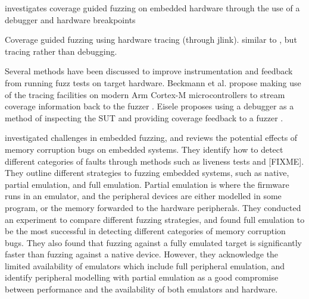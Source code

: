 \documentclass[../report.tex]{subfiles}
\begin{document}
\citet{Eisele_2022} investigates coverage guided fuzzing on embedded hardware through the use of a debugger and hardware breakpoints

\citet{Beckmann_2023} Coverage guided fuzzing using hardware tracing (through jlink). similar to \citet{Eisele_2022}, but tracing rather than debugging.

Several methods have been discussed to improve instrumentation and feedback
from running fuzz tests on target hardware. Beckmann et al. propose making use
of the tracing facilities on modern Arm Cortex-M microcontrollers to stream
coverage information back to the fuzzer \citep{Beckmann_2023}. Eisele proposes
using a debugger as a method of inspecting the SUT and providing coverage
feedback to a fuzzer \citep{Eisele_2022}.
%

\citet{Muench_2018} investigated challenges in embedded fuzzing, and reviews
the potential effects of memory corruption bugs on embedded systems.
They identify how to detect different categories of faults through methods such
as liveness tests and [FIXME]. They outline different strategies to fuzzing embedded
systems, such as native, partial emulation, and full emulation. Partial
emulation is where the firmware runs in an emulator, and the peripheral devices
are either modelled in some program, or the memory forwarded to the hardware
peripherals. They conducted an experiment to compare different fuzzing
strategies, and found full emulation to be the most successful in detecting
different categories of memory corruption bugs. They also found that fuzzing
against a fully emulated target is significantly faster than fuzzing against a
native device. However, they acknowledge the limited availability of emulators
which include full peripheral emulation, and identify peripheral modelling with
partial emulation as a good compromise between performance and the availability of
both emulators and hardware.
\end{document}
